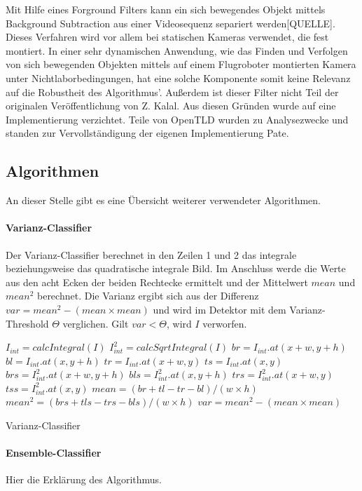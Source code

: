 Mit Hilfe eines Forground Filters kann ein sich bewegendes Objekt mittels Background Subtraction aus einer Videosequenz separiert werden{[}QUELLE{]}. Dieses Verfahren wird vor allem bei statischen Kameras verwendet, die fest montiert. In einer sehr dynamischen Anwendung, wie das Finden und Verfolgen von sich bewegenden Objekten mittels auf einem Flugroboter montierten Kamera unter Nichtlaborbedingungen, hat eine solche Komponente somit keine Relevanz auf die Robustheit des Algorithmus'. Außerdem ist dieser Filter nicht Teil der originalen Veröffentlichung von Z. Kalal. Aus diesen Gründen wurde auf eine Implementierung verzichtet. Teile von OpenTLD wurden zu Analysezwecke und standen zur Vervollständigung der eigenen Implementierung Pate.

\subsection*{Algorithmen}
An dieser Stelle gibt es eine Übersicht weiterer verwendeter Algorithmen.

\paragraph{Varianz-Classifier}
Der Varianz-Classifier berechnet in den Zeilen 1 und 2 das integrale beziehungsweise das quadratische integrale Bild. Im Anschluss werde die Werte aus den acht Ecken der beiden Rechtecke ermittelt und der Mittelwert $mean$ und $mean^2$ berechnet. Die Varianz ergibt sich aus der Differenz $var = mean^2 - (mean\times mean)$ und wird im Detektor mit dem Varianz-Threshold $\Theta$ verglichen. Gilt $var < \Theta$, wird $I$ verworfen.

\begin{algorithm}[H]
	\vspace{0.2cm}
	$I_{int} = calcIntegral(I)$\;
	$I^2_{int} = calcSqrtIntegral(I)$\;
	$br=I_{int}.at(x + w, y + h)$\;
	$bl=I_{int}.at(x, y + h)$\;
	$tr=I_{int}.at(x + w, y)$\;
	$ts=I_{int}.at(x, y)$\;
	$brs=I^2_{int}.at(x + w, y + h)$\;
	$bls=I^2_{int}.at(x, y + h)$\;
	$trs=I^2_{int}.at(x + w, y)$\;
	$tss=I^2_{int}.at(x, y)$\;
	$mean = (br + tl - tr - bl)/(w\times h)$\;
	$mean^2 = (brs + tls - trs - bls)/(w\times h)$\;
	$var = mean^2 - (mean\times mean)$\;
	\caption{Varianz-Classifier}
	\label{alg:varianz}
	\vspace{0.2cm}
\end{algorithm}

\paragraph{Ensemble-Classifier}
Hier die Erklärung des Algorithmus.

